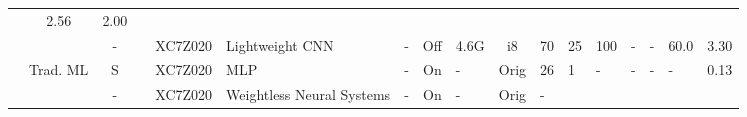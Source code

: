 \documentclass{article}
\begin{document}
\begin{table}
\begin{adjustbox}{totalheight=\baselineskip,}
\begin{tabular}{ccccclp{2em}cp{3em}cp{2em}p{4em}p{3em}p{3.5em}p{3.5em}p{2.5em}p{3em}}
                                                           &\multirow{1}{*}{2.56}
                                                               &\multirow{1}{*}{2.00}\\
\cmidrule{3-17}
   &   &\multirow{1}{*}{-}
           &\multirow{1}{*}{\cite{wangFastDetectionObstacle2024}}
               &\multirow{1}{*}{XC7Z020}
                   &\multirow{1}{*}{Lightweight CNN}
                       &\multirow{1}{*}{-}
                           &\multirow{1}{*}{Off}
                               &\multirow{1}{*}{4.6G}
                                   &\multirow{1}{*}{i8}
                                       &\multirow{1}{*}{70}
                                           &\multirow{1}{*}{25}
                                               &\multirow{1}{*}{100}
                                                   &\multirow{1}{*}{-}
                                                       &\multirow{1}{*}{-}
                                                           &\multirow{1}{*}{60.0}
                                                               &\multirow{1}{*}{3.30}\\
\cmidrule{2-17}
   &\multirow{2}{*}{Trad. ML}
       &\multirow{1}{*}{S}
           &\multirow{1}{*}{\cite{hammoudArtificialNeuralNetworksBased2022a}}
               &\multirow{1}{*}{XC7Z020}
                   &\multirow{1}{*}{MLP}
                       &\multirow{1}{*}{-}
                           &\multirow{1}{*}{On}
                               &\multirow{1}{*}{-}
                                   &\multirow{1}{*}{Orig}
                                       &\multirow{1}{*}{26}
                                           &\multirow{1}{*}{1}
                                               &\multirow{1}{*}{-}
                                                   &\multirow{1}{*}{-}
                                                       &\multirow{1}{*}{-}
                                                           &\multirow{1}{*}{-}
                                                               &\multirow{1}{*}{0.13}\\
\cmidrule{3-17}
   &   &\multirow{1}{*}{-}
           &\multirow{1}{*}{\cite{torresCombinedWeightlessNeural2020}}
               &\multirow{1}{*}{XC7Z020}
                   &\multirow{1}{*}{Weightless Neural Systems}
                       &\multirow{1}{*}{-}
                           &\multirow{1}{*}{On}
                               &\multirow{1}{*}{-}
                                   &\multirow{1}{*}{Orig}
                                       &\multirow{1}{*}{-}

\end{tabular}
\end{adjustbox}
\end{table}
\end{document}

